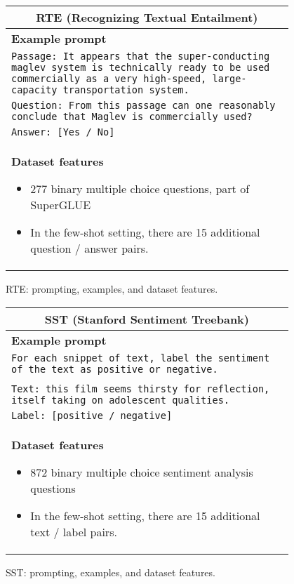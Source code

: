 \begin{figure}[p]
    \centering \small
    \begin{tabular}{p{0.95\linewidth}}
    \toprule
    \multicolumn{1}{c}{\textbf{RTE (Recognizing Textual Entailment)}} \\

    \midrule
    \textbf{Example prompt}  \\
    \texttt{Passage: It appears that the super-conducting maglev system is technically ready to be used commercially as a very high-speed, large-capacity transportation system.} \\
    \texttt{Question: From this passage can one reasonably conclude that Maglev is commercially used?} \\
    \texttt{Answer: [Yes / No]} \\

    \midrule
    \textbf{Dataset features}
    \begin{itemize}
        \item 277 binary multiple choice questions, part of SuperGLUE
        \item In the few-shot setting, there are 15 additional question / answer pairs.
    \end{itemize} \\

    \bottomrule
    \end{tabular}
    \caption{RTE: prompting, examples, and dataset features.}
    \label{tab:prompt-rte}
\end{figure}

\begin{figure}[p]
    \centering \small
    \begin{tabular}{p{0.95\linewidth}}
    \toprule
    \multicolumn{1}{c}{\textbf{SST (Stanford Sentiment Treebank)}} \\

    \midrule
    \textbf{Example prompt}  \\
    \texttt{For each snippet of text, label the sentiment of the text as positive or negative.} \\\\
    \texttt{Text: this film seems thirsty for reflection, itself taking on adolescent qualities.} \\
    \texttt{Label: [positive / negative]} \\

    \midrule
    \textbf{Dataset features}
    \begin{itemize}
        \item 872 binary multiple choice sentiment analysis questions
        \item In the few-shot setting, there are 15 additional text / label pairs.
    \end{itemize} \\

    \bottomrule
    \end{tabular}
    \caption{SST: prompting, examples, and dataset features.}
    \label{tab:prompt-sst}
\end{figure}

